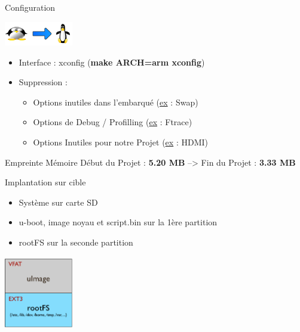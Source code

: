 \documentclass[11pt]{beamer}
\begin{document}
	
	\begin{frame}{Configuration}

	 \begin{center}
	 \includegraphics[width=3cm]{common/tuxleg.png}\\
	 \end{center}
	 \begin{itemize}
		\item Interface : xconfig (\textbf{make ARCH=arm xconfig})
		\item Suppression : 
			\begin{itemize}
			    \item Options inutiles dans l'embarqué (\underline{ex} : Swap)
			    \item Options de Debug / Profilling (\underline{ex} : Ftrace)
			    \item Options Inutiles pour notre Projet (\underline{ex} : HDMI)
			 \end{itemize}
		 \end{itemize}
	 \begin{block}{Empreinte Mémoire}
	 \centering Début du Projet : \textbf{5.20 MB} --> Fin du Projet : \textbf{3.33 MB}
	 \end{block}	
	\end{frame}
	
	\begin{frame}{Implantation sur cible}
	\begin{itemize}
	 \item Système sur carte SD
	 \item u-boot, image noyau et script.bin sur la 1ère partition
	 \item rootFS sur la seconde partition
	\end{itemize}

	\centering \includegraphics[width=3cm]{common/SD.png}\\
	\end{frame}
	
	
\end{document}
